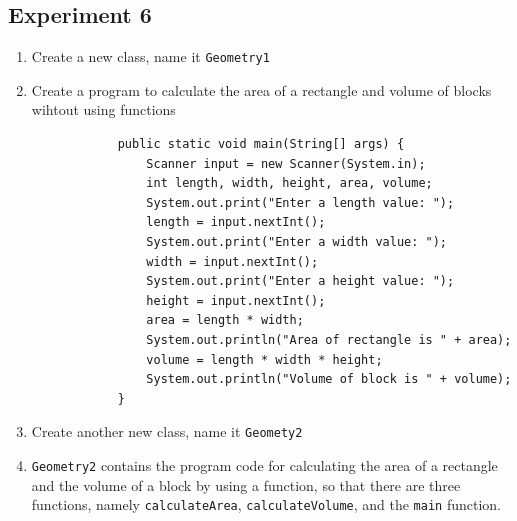 \documentclass[12pt,titlepage]{article}
\begin{document}
\subsection{Experiment 6}
\begin{enumerate}
    \item Create a new class, name it \texttt{Geometry1}
    \item {
        Create a program to calculate the area of a rectangle and volume of blocks wihtout using functions

        \begin{verbatim}
            public static void main(String[] args) {
                Scanner input = new Scanner(System.in);
                int length, width, height, area, volume;
                System.out.print("Enter a length value: ");
                length = input.nextInt();
                System.out.print("Enter a width value: ");
                width = input.nextInt();
                System.out.print("Enter a height value: ");
                height = input.nextInt();
                area = length * width;
                System.out.println("Area of rectangle is " + area);
                volume = length * width * height;
                System.out.println("Volume of block is " + volume);
            }
        \end{verbatim}
    }
    \item Create another new class, name it \texttt{Geomety2}
    \item {
        \texttt{Geometry2} contains the program code for calculating the area of a rectangle
        and the volume of a block by using a function, so that there are three functions,
        namely \texttt{calculateArea}, \texttt{calculateVolume}, and the \texttt{main} function.

}
\end{enumerate}
\end{document}
